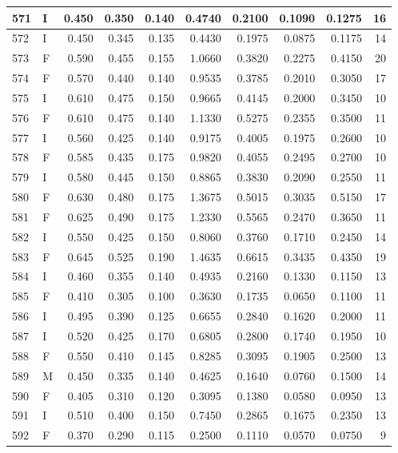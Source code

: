 \documentclass[9pt,twocolumn,twoside,]{pnas-new}
\begin{document}
\begin{tabular}{l|l|r|r|r|r|r|r|r|r}
\hline
571 & I & 0.450 & 0.350 & 0.140 & 0.4740 & 0.2100 & 0.1090 & 0.1275 & 16\\
\hline
572 & I & 0.450 & 0.345 & 0.135 & 0.4430 & 0.1975 & 0.0875 & 0.1175 & 14\\
\hline
573 & F & 0.590 & 0.455 & 0.155 & 1.0660 & 0.3820 & 0.2275 & 0.4150 & 20\\
\hline
574 & F & 0.570 & 0.440 & 0.140 & 0.9535 & 0.3785 & 0.2010 & 0.3050 & 17\\
\hline
575 & I & 0.610 & 0.475 & 0.150 & 0.9665 & 0.4145 & 0.2000 & 0.3450 & 10\\
\hline
576 & F & 0.610 & 0.475 & 0.140 & 1.1330 & 0.5275 & 0.2355 & 0.3500 & 11\\
\hline
577 & I & 0.560 & 0.425 & 0.140 & 0.9175 & 0.4005 & 0.1975 & 0.2600 & 10\\
\hline
578 & F & 0.585 & 0.435 & 0.175 & 0.9820 & 0.4055 & 0.2495 & 0.2700 & 10\\
\hline
579 & I & 0.580 & 0.445 & 0.150 & 0.8865 & 0.3830 & 0.2090 & 0.2550 & 11\\
\hline
580 & F & 0.630 & 0.480 & 0.175 & 1.3675 & 0.5015 & 0.3035 & 0.5150 & 17\\
\hline
581 & F & 0.625 & 0.490 & 0.175 & 1.2330 & 0.5565 & 0.2470 & 0.3650 & 11\\
\hline
582 & I & 0.550 & 0.425 & 0.150 & 0.8060 & 0.3760 & 0.1710 & 0.2450 & 14\\
\hline
583 & F & 0.645 & 0.525 & 0.190 & 1.4635 & 0.6615 & 0.3435 & 0.4350 & 19\\
\hline
584 & I & 0.460 & 0.355 & 0.140 & 0.4935 & 0.2160 & 0.1330 & 0.1150 & 13\\
\hline
585 & F & 0.410 & 0.305 & 0.100 & 0.3630 & 0.1735 & 0.0650 & 0.1100 & 11\\
\hline
586 & I & 0.495 & 0.390 & 0.125 & 0.6655 & 0.2840 & 0.1620 & 0.2000 & 11\\
\hline
587 & I & 0.520 & 0.425 & 0.170 & 0.6805 & 0.2800 & 0.1740 & 0.1950 & 10\\
\hline
588 & F & 0.550 & 0.410 & 0.145 & 0.8285 & 0.3095 & 0.1905 & 0.2500 & 13\\
\hline
589 & M & 0.450 & 0.335 & 0.140 & 0.4625 & 0.1640 & 0.0760 & 0.1500 & 14\\
\hline
590 & F & 0.405 & 0.310 & 0.120 & 0.3095 & 0.1380 & 0.0580 & 0.0950 & 13\\
\hline
591 & I & 0.510 & 0.400 & 0.150 & 0.7450 & 0.2865 & 0.1675 & 0.2350 & 13\\
\hline
592 & F & 0.370 & 0.290 & 0.115 & 0.2500 & 0.1110 & 0.0570 & 0.0750 & 9\\

\end{tabular}
\end{document}
